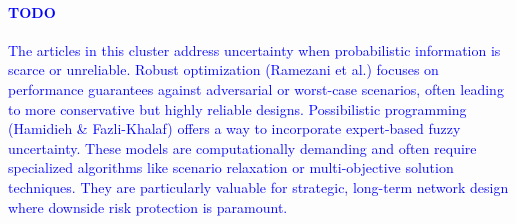 \textcolor{blue}
{\paragraph{TODO}
The articles in this cluster address uncertainty when probabilistic information is scarce or unreliable. Robust optimization (Ramezani et al.) focuses on performance guarantees against adversarial or worst-case scenarios, often leading to more conservative but highly reliable designs. Possibilistic programming (Hamidieh \& Fazli-Khalaf) offers a way to incorporate expert-based fuzzy uncertainty. These models are computationally demanding and often require specialized algorithms like scenario relaxation or multi-objective solution techniques. They are particularly valuable for strategic, long-term network design where downside risk protection is paramount.}
